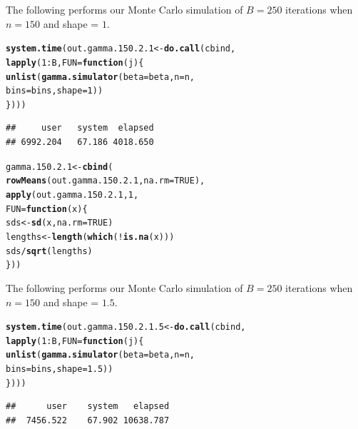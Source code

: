 \documentclass[11pt]{article}\usepackage[]{graphicx}\usepackage[]{color}
\makeatletter
\newcommand{\hlnum}[1]{\textcolor[rgb]{0.686,0.059,0.569}{#1}}%
\newcommand{\hlopt}[1]{\textcolor[rgb]{0,0,0}{#1}}%
\newcommand{\hlstd}[1]{\textcolor[rgb]{0.345,0.345,0.345}{#1}}%
\newcommand{\hlkwa}[1]{\textcolor[rgb]{0.161,0.373,0.58}{\textbf{#1}}}%
\newcommand{\hlkwb}[1]{\textcolor[rgb]{0.69,0.353,0.396}{#1}}%
\newcommand{\hlkwc}[1]{\textcolor[rgb]{0.333,0.667,0.333}{#1}}%
\newcommand{\hlkwd}[1]{\textcolor[rgb]{0.737,0.353,0.396}{\textbf{#1}}}%
\newenvironment{kframe}{%
 \def\at@end@of@kframe{}%
 \ifinner\ifhmode%
  \def\at@end@of@kframe{\end{minipage}}%
  \begin{minipage}{\columnwidth}%
 \fi\fi%
 \def\FrameCommand##1{\hskip\@totalleftmargin \hskip-\fboxsep
 \colorbox{shadecolor}{##1}\hskip-\fboxsep
     \hskip-\linewidth \hskip-\@totalleftmargin \hskip\columnwidth}%
 \MakeFramed {\advance\hsize-\width
   \@totalleftmargin\z@ \linewidth\hsize
   \@setminipage}}%
 {\par\unskip\endMakeFramed%
 \at@end@of@kframe}
\newenvironment{knitrout}{}{} %
\makeatother
\begin{document}
The following performs our Monte Carlo simulation of $B = 250$ iterations 
when $n = 150$ and shape = $1$.

\begin{knitrout}
\color{fgcolor}\begin{kframe}
\begin{alltt}
\hlkwd{system.time}\hlstd{(out.gamma.150.2.1} \hlkwb{<-} \hlkwd{do.call}\hlstd{(cbind,}
  \hlkwd{lapply}\hlstd{(}\hlnum{1}\hlopt{:}\hlstd{B,} \hlkwc{FUN} \hlstd{=} \hlkwa{function}\hlstd{(}\hlkwc{j}\hlstd{)\{}
    \hlkwd{unlist}\hlstd{(}\hlkwd{gamma.simulator}\hlstd{(}\hlkwc{beta} \hlstd{= beta,} \hlkwc{n} \hlstd{= n,}
      \hlkwc{bins} \hlstd{= bins,} \hlkwc{shape} \hlstd{=} \hlnum{1}\hlstd{))}
\hlstd{\})))}
\end{alltt}
\begin{verbatim}
##     user   system  elapsed 
## 6992.204   67.186 4018.650
\end{verbatim}
\end{kframe}
\end{knitrout}

\begin{knitrout}
\color{fgcolor}\begin{kframe}
\begin{alltt}
\hlstd{gamma.150.2.1} \hlkwb{<-} \hlkwd{cbind}\hlstd{(}
  \hlkwd{rowMeans}\hlstd{(out.gamma.150.2.1,} \hlkwc{na.rm} \hlstd{=} \hlnum{TRUE}\hlstd{),}
  \hlkwd{apply}\hlstd{(out.gamma.150.2.1,} \hlnum{1}\hlstd{,}
  \hlkwc{FUN} \hlstd{=} \hlkwa{function}\hlstd{(}\hlkwc{x}\hlstd{)\{}
    \hlstd{sds} \hlkwb{<-} \hlkwd{sd}\hlstd{(x,} \hlkwc{na.rm} \hlstd{=} \hlnum{TRUE}\hlstd{)}
    \hlstd{lengths} \hlkwb{<-} \hlkwd{length}\hlstd{(}\hlkwd{which}\hlstd{(}\hlopt{!}\hlkwd{is.na}\hlstd{(x)))}
    \hlstd{sds} \hlopt{/} \hlkwd{sqrt}\hlstd{(lengths)}
  \hlstd{\}))}
\end{alltt}
\end{kframe}
\end{knitrout}

The following performs our Monte Carlo simulation of $B = 250$ iterations 
when $n = 150$ and shape = $1.5$.

\begin{knitrout}
\color{fgcolor}\begin{kframe}
\begin{alltt}
\hlkwd{system.time}\hlstd{(out.gamma.150.2.1.5} \hlkwb{<-} \hlkwd{do.call}\hlstd{(cbind,}
  \hlkwd{lapply}\hlstd{(}\hlnum{1}\hlopt{:}\hlstd{B,} \hlkwc{FUN} \hlstd{=} \hlkwa{function}\hlstd{(}\hlkwc{j}\hlstd{)\{}
    \hlkwd{unlist}\hlstd{(}\hlkwd{gamma.simulator}\hlstd{(}\hlkwc{beta} \hlstd{= beta,} \hlkwc{n} \hlstd{= n,}
      \hlkwc{bins} \hlstd{= bins,} \hlkwc{shape} \hlstd{=} \hlnum{1.5}\hlstd{))}
\hlstd{\})))}
\end{alltt}
\begin{verbatim}
##      user    system   elapsed 
##  7456.522    67.902 10638.787
\end{verbatim}
\end{kframe}
\end{knitrout}
\end{document}
